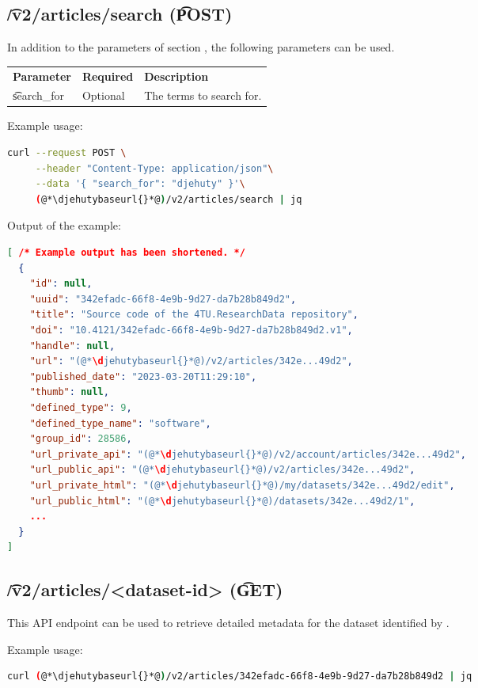 \subsection{\t{/v2/articles/search} (\t{POST})}

  In addition to the parameters of section , the
  following parameters can be used.

\begin{tabularx}{\textwidth}{*{2}{!{\VRule[-1pt]}l}!{\VRule[-1pt]}X}
  \headrow
  \textbf{Parameter}   & \textbf{Required} & \textbf{Description}\\
  \t{search\_for}      & Optional & The terms to search for.
\end{tabularx}

  Example usage:
\begin{lstlisting}[language=bash]
curl --request POST \
     --header "Content-Type: application/json"\
     --data '{ "search_for": "djehuty" }'\
     (@*\djehutybaseurl{}*@)/v2/articles/search | jq
\end{lstlisting}

  Output of the example:
\begin{lstlisting}[language=JSON]
[ /* Example output has been shortened. */
  {
    "id": null,
    "uuid": "342efadc-66f8-4e9b-9d27-da7b28b849d2",
    "title": "Source code of the 4TU.ResearchData repository",
    "doi": "10.4121/342efadc-66f8-4e9b-9d27-da7b28b849d2.v1",
    "handle": null,
    "url": "(@*\djehutybaseurl{}*@)/v2/articles/342e...49d2",
    "published_date": "2023-03-20T11:29:10",
    "thumb": null,
    "defined_type": 9,
    "defined_type_name": "software",
    "group_id": 28586,
    "url_private_api": "(@*\djehutybaseurl{}*@)/v2/account/articles/342e...49d2",
    "url_public_api": "(@*\djehutybaseurl{}*@)/v2/articles/342e...49d2",
    "url_private_html": "(@*\djehutybaseurl{}*@)/my/datasets/342e...49d2/edit",
    "url_public_html": "(@*\djehutybaseurl{}*@)/datasets/342e...49d2/1",
    ...
  }
]
\end{lstlisting}

\subsection{\t{/v2/articles/<dataset-id>} (\t{GET})}
\label{sec:v2-articles-dataset-id}

  This API endpoint can be used to retrieve detailed metadata for the dataset
  identified by \code{dataset-id}.

  Example usage:
\begin{lstlisting}[language=bash]
curl (@*\djehutybaseurl{}*@)/v2/articles/342efadc-66f8-4e9b-9d27-da7b28b849d2 | jq
\end{lstlisting}

